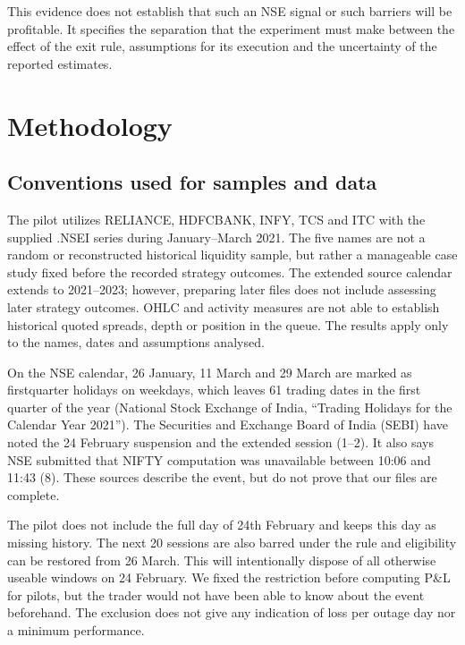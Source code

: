 \documentclass[11pt,a4paper]{article}
\begin{document}
This evidence does not establish that such an NSE signal or such barriers will be profitable. It specifies the separation that the experiment must make between the effect of the exit rule, assumptions for its execution and the uncertainty of the reported estimates.

\section*{Methodology}

\subsection*{Conventions used for samples and data}

The pilot utilizes RELIANCE, HDFCBANK, INFY, TCS and ITC with the supplied .NSEI series during January--March 2021. The five names are not a random or reconstructed historical liquidity sample, but rather a manageable case study fixed before the recorded strategy outcomes. The extended source calendar extends to 2021--2023; however, preparing later files does not include assessing later strategy outcomes. OHLC and activity measures are not able to establish historical quoted spreads, depth or position in the queue. The results apply only to the names, dates and assumptions analysed.

On the NSE calendar, 26 January, 11 March and 29 March are marked as first\allowbreak{}quarter holidays on weekdays, which leaves 61 trading dates in the first quarter of the year (National Stock Exchange of India, “Trading Holidays for the Calendar Year 2021”). The Securities and Exchange Board of India (SEBI) have noted the 24 February suspension and the extended session (1–2). It also says NSE submitted that NIFTY computation was unavailable between 10:06 and 11:43 (8). These sources describe the event, but do not prove that our files are complete.

The pilot does not include the full day of 24th February and keeps this day as missing history. The next 20 sessions are also barred under the rule and eligibility can be restored from 26 March. This will intentionally dispose of all otherwise useable windows on 24 February. We fixed the restriction before computing P\&L for pilots, but the trader would not have been able to know about the event beforehand. The exclusion does not give any indication of loss per outage day nor a minimum performance.
\end{document}
